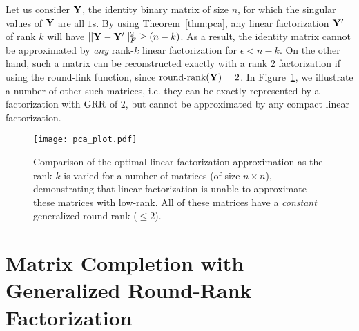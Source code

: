 \documentclass{article}
\begin{document}
Let us consider $\mathbf{Y}$, the identity binary matrix of size $n$, for which the singular values of $\mathbf{Y}$ are all $1$s. 
By using Theorem~\ref{thm:pca}, any linear factorization $\mathbf{Y}'$ of rank $k$ will have $||\mathbf{Y}-\mathbf{Y}'||_F^2\geq(n-k)$.
As a result, the identity matrix cannot be approximated by \emph{any} rank-$k$ linear factorization for $\epsilon<{n-k}$. 
On the other hand, such a matrix can be reconstructed exactly with
a rank $2$ factorization if using the round-link function, since $\text{round-rank}(\mathbf{Y})=2$.
%
%
%
%
In Figure~\ref{fig:pca_plot}, we illustrate a number of other such matrices, i.e. they can be exactly represented by a factorization with $\text{GRR}$ of $2$, but cannot be approximated by any compact linear factorization.
\begin{figure}
    \centering
        \texttt{[image: pca\_plot.pdf]}
    	\caption{Comparison of the optimal linear factorization approximation as the rank $k$ is varied for a number of matrices (of size $n\times n$), demonstrating that linear factorization is unable to approximate these matrices with low-rank. All of these matrices have a \emph{constant} generalized round-rank ($\leq 2$).}
    	\label{fig:pca_plot}
\end{figure}
\section{Matrix Completion with Generalized Round-Rank Factorization}
\label{sec:SC}
\end{document}
